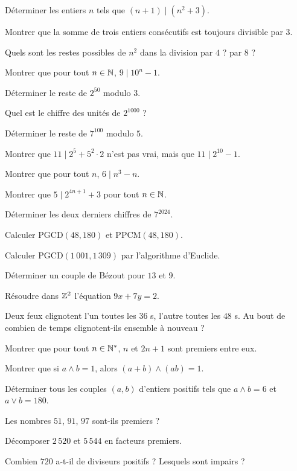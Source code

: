 \exo{} Déterminer les entiers $n$ tels que $(n+1)\mid(n^2+3)$.

\exo{} Montrer que la somme de trois entiers consécutifs est toujours divisible par $3$.

\exo{} Quels sont les restes possibles de $n^2$ dans la division par $4$ ? par $8$ ?

\exo{} Montrer que pour tout $n\in\mathbb{N}$, $9\mid 10^n-1$.

\exo{} Déterminer le reste de $2^{50}$ modulo $3$.

\exo{} Quel est le chiffre des unités de $2^{1000}$ ?

\exo{} Déterminer le reste de $7^{100}$ modulo $5$.

\exo{} Montrer que $11\mid 2^{5}+5^{2}\cdot 2$ n'est pas vrai, mais que $11\mid 2^{10}-1$.

\exo{} Montrer que pour tout $n$, $6\mid n^3-n$.

\exo{} Montrer que $5\mid 2^{4n+1}+3$ pour tout $n\in\mathbb{N}$.

\exo{} Déterminer les deux derniers chiffres de $7^{2024}$.

\exo{} Calculer $\mathrm{PGCD}(48,180)$ et $\mathrm{PPCM}(48,180)$.

\exo{} Calculer $\mathrm{PGCD}(1\,001,1\,309)$ par l'algorithme d'Euclide.

\exo{} Déterminer un couple de Bézout pour $13$ et $9$.

\exo{} Résoudre dans $\mathbb{Z}^2$ l'équation $9x+7y=2$.

\exo{} Deux feux clignotent l'un toutes les $36$ s, l'autre toutes les $48$ s. Au bout de combien de temps clignotent-ils ensemble à nouveau ?

\exo{} Montrer que pour tout $n\in\mathbb{N}^*$, $n$ et $2n+1$ sont premiers entre eux.

\exo{} Montrer que si $a\wedge b=1$, alors $(a+b)\wedge(ab)=1$.

\exo{} Déterminer tous les couples $(a,b)$ d'entiers positifs tels que $a\wedge b=6$ et $a\vee b=180$.

\exo{} Les nombres $51$, $91$, $97$ sont-ils premiers ?

\exo{} Décomposer $2\,520$ et $5\,544$ en facteurs premiers.

\exo{} Combien $720$ a-t-il de diviseurs positifs ? Lesquels sont impairs ?

